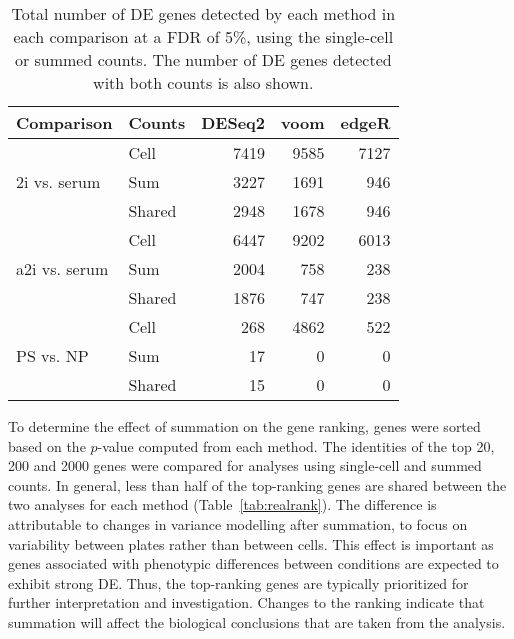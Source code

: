 \documentclass{article}
\begin{document}
\begin{table}[btp]
\caption{Total number of DE genes detected by each method in each comparison at a FDR of 5\%, using the single-cell or summed counts.
The number of DE genes detected with both counts is also shown.
}
\label{tab:realnum}
\begin{center}
\begin{tabular}{l l r r r}
\hline
\textbf{Comparison} & \textbf{Counts} & \textbf{DESeq2} & \textbf{voom} & \textbf{edgeR} \\
\hline
\multirow{3}{*}{2i vs. serum} 
& Cell & 7419 & 9585 & 7127 \\
& Sum & 3227 & 1691 & 946 \\
& Shared & 2948 & 1678 & 946 \\
\hline
\multirow{3}{*}{a2i vs. serum} 
& Cell & 6447 & 9202 & 6013 \\
& Sum & 2004 & 758 & 238 \\
& Shared & 1876 & 747 & 238 \\
\hline
\multirow{3}{*}{PS vs. NP} 
& Cell & 268 & 4862 & 522 \\
& Sum & 17 & 0 & 0 \\
& Shared & 15 & 0 & 0 \\
\hline
\end{tabular}
\end{center}
\end{table}

To determine the effect of summation on the gene ranking, genes were sorted based on the $p$-value computed from each method.
The identities of the top 20, 200 and 2000 genes were compared for analyses using single-cell and summed counts.
In general, less than half of the top-ranking genes are shared between the two analyses for each method (Table~\ref{tab:realrank}).
The difference is attributable to changes in variance modelling after summation, to focus on variability between plates rather than between cells.
This effect is important as genes associated with phenotypic differences between conditions are expected to exhibit strong DE.
Thus, the top-ranking genes are typically prioritized for further interpretation and investigation.
Changes to the ranking indicate that summation will affect the biological conclusions that are taken from the analysis.
\end{document}
